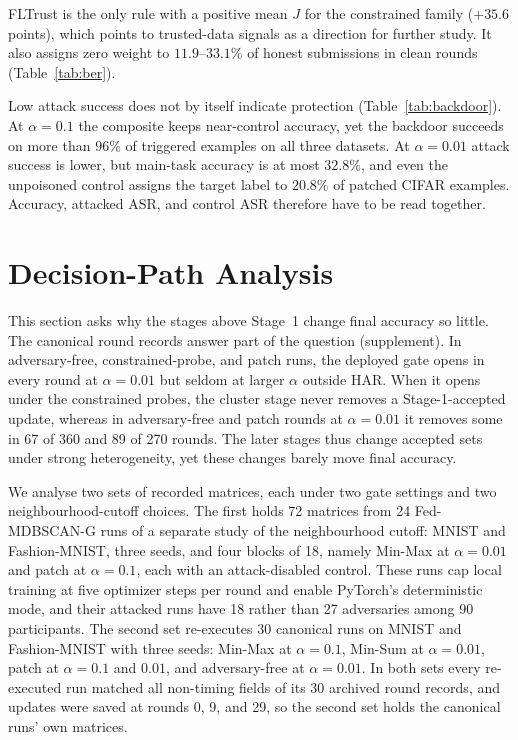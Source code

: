 \documentclass[journal]{IEEEtran}
\begin{document}
FLTrust is the only rule with a positive mean $J$ for the constrained family ($+35.6$ points), which points to trusted-data signals as a direction for further study. It also assigns zero weight to $11.9$--$33.1\%$ of honest submissions in clean rounds (Table~\ref{tab:ber}).


Low attack success does not by itself indicate protection (Table~\ref{tab:backdoor}). At $\alpha=0.1$ the composite keeps near-control accuracy, yet the backdoor succeeds on more than $96\%$ of triggered examples on all three datasets. At $\alpha=0.01$ attack success is lower, but main-task accuracy is at most $32.8\%$, and even the unpoisoned control assigns the target label to $20.8\%$ of patched CIFAR examples. Accuracy, attacked ASR, and control ASR therefore have to be read together.

\section{Decision-Path Analysis}\label{sec:mechanism}
This section asks why the stages above Stage~1 change final accuracy so little. The canonical round records answer part of the question (supplement). In adversary-free, constrained-probe, and patch runs, the deployed gate opens in every round at $\alpha=0.01$ but seldom at larger $\alpha$ outside HAR. When it opens under the constrained probes, the cluster stage never removes a Stage-1-accepted update, whereas in adversary-free and patch rounds at $\alpha=0.01$ it removes some in 67 of 360 and 89 of 270 rounds. The later stages thus change accepted sets under strong heterogeneity, yet these changes barely move final accuracy.

We analyse two sets of recorded matrices, each under two gate settings and two neighbourhood-cutoff choices. The first holds 72 matrices from 24 Fed-MDBSCAN-G runs of a separate study of the neighbourhood cutoff: MNIST and Fashion-MNIST, three seeds, and four blocks of 18, namely Min-Max at $\alpha=0.01$ and patch at $\alpha=0.1$, each with an attack-disabled control. These runs cap local training at five optimizer steps per round and enable PyTorch's deterministic mode, and their attacked runs have 18 rather than 27 adversaries among 90 participants. The second set re-executes 30 canonical runs on MNIST and Fashion-MNIST with three seeds: Min-Max at $\alpha=0.1$, Min-Sum at $\alpha=0.01$, patch at $\alpha=0.1$ and $0.01$, and adversary-free at $\alpha=0.01$. In both sets every re-executed run matched all non-timing fields of its 30 archived round records, and updates were saved at rounds 0, 9, and 29, so the second set holds the canonical runs' own matrices.
\end{document}
